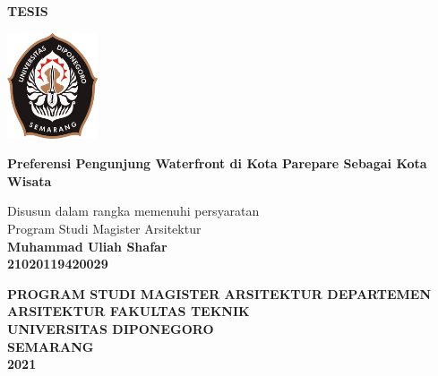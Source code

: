 \documentclass[12pt,oneside]{udthesis}\usepackage[]{graphicx}\usepackage[]{color}
\def \Title{TESIS}
\def \subtitle{Preferensi Pengunjung Waterfront di Kota Parepare Sebagai Kota Wisata}
\def \yourName{Muhammad Uliah Shafar}
\def \yourIdentifier{21020119420029}
\begin{document}




\begin{titlepage}
	\begin{center}

\mbox{}\vfill

  {\bf \Title \par}

    \vspace{2\baselineskip}
		\includegraphics[width=0.20\textwidth]{figures/logo}

    \vspace{2\baselineskip}

		{\large\bf\MakeUppercase \subtitle}

    \vspace{\baselineskip}
    Disusun dalam rangka memenuhi persyaratan\\ Program Studi Magister Arsitektur\\
    \vspace{\baselineskip}
        {\bf
           {\MakeUppercase\yourName}\\
           \yourIdentifier
        }

    \vspace{3\baselineskip}
		{\large\bf PROGRAM STUDI MAGISTER ARSITEKTUR DEPARTEMEN ARSITEKTUR FAKULTAS TEKNIK\\ UNIVERSITAS DIPONEGORO\\
			SEMARANG\\
			2021
		}
	\end{center}
\vfill\mbox{}

\end{titlepage}
\end{document}
